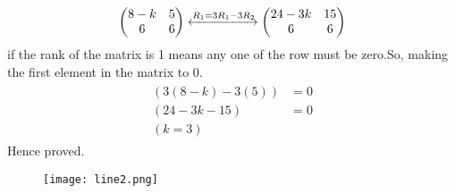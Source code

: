 \documentclass[12pt]{article}
\newcommand{\myvec}[1]{\ensuremath{\begin{pmatrix}#1\end{pmatrix}}}
\providecommand{\brak}[1]{\ensuremath{\left(#1\right)}}
\begin{document}
\begin{align}
\label{eq:chem_balance_mat_row}
\myvec{
8-k & 5
\\
6 & 6
}
 \xleftrightarrow[]{R_1 = 3R_1-3R_2}
\myvec{
24-3k & 15
\\
6 & 6
}
\end{align}
if the rank of the matrix is 1 means any one of the row must be zero.So, making the first element in the matrix to 0.
\begin{align}
\begin{split}
\brak{3(8-k)-3(5)}&=0
\\
\brak{24-3k-15}&=0
\\
\brak{k=3} 
\end{split}
\end{align}
Hence proved.
\begin{figure}[h!]
	  \centering 
	  \texttt{[image: line2.png]}
	  \caption{}
	  \label{fig:line2.png}
	  \end{figure} 
\end{document}
